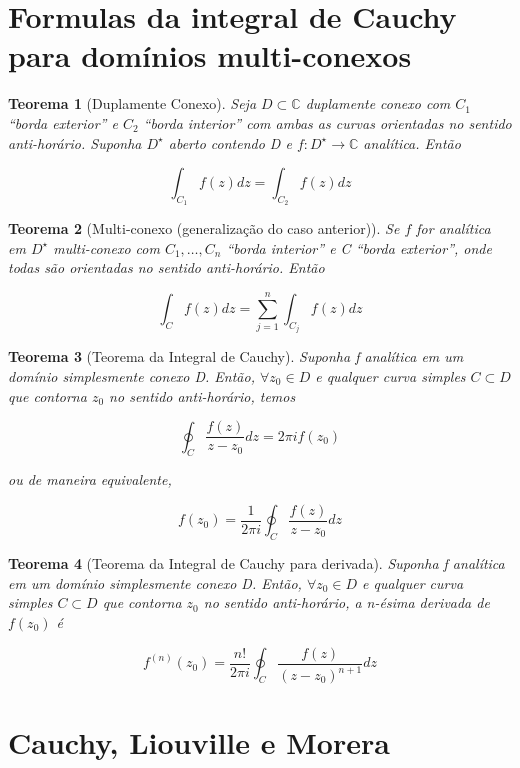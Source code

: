 \documentclass{article}
\newtheorem{theorem}{Teorema}
\begin{document}
\section*{Formulas da integral de Cauchy para domínios multi-conexos}
\label{s6}

\begin{theorem}[Duplamente Conexo]
Seja $D \subset \mathbb{C}$ duplamente conexo com $C_1$ ``borda exterior'' e $C_2$ ``borda interior'' com ambas as curvas orientadas no sentido anti-horário. Suponha $D^\star$ aberto contendo D e $f: D^\star \rightarrow \mathbb{C}$ analítica. Então

$$\int_{C_1} f(z) d z = \int_{C_2} f(z) d z$$
\end{theorem}

\begin{theorem}[Multi-conexo (generalização do caso anterior)]
Se $f$ for analítica em $D^\star$ multi-conexo com $C_1, \ldots, C_n$ ``borda interior'' e C ``borda exterior'', onde todas são orientadas no sentido anti-horário. Então

$$\int_C f(z) d z = \sum_{j = 1}^n \int_{C_j} f(z) d z$$
\end{theorem}

\begin{theorem}[Teorema da Integral de Cauchy]
Suponha f analítica em um domínio simplesmente conexo D. Então, $\forall z_0 \in D$ e qualquer curva simples $C \subset D$ que contorna $z_0$ no sentido anti-horário, temos

$$\oint_C \frac{f(z)}{z - z_0} dz = 2 \pi i f(z_0)$$

ou de maneira equivalente,

$$f(z_0) = \frac{1}{2 \pi i} \oint_C \frac{f(z)}{z - z_0} d z$$
\end{theorem}

\begin{theorem}[Teorema da Integral de Cauchy para derivada]
Suponha f analítica em um domínio simplesmente conexo D. Então, $\forall z_0 \in D$ e qualquer curva simples $C \subset D$ que contorna $z_0$ no sentido anti-horário, a n-ésima derivada de $f(z_0)$ é

$$f^{(n)}(z_0) = \frac{n!}{2 \pi i} \oint_C \frac{f(z)}{(z - z_0)^{n + 1}} d z$$
\end{theorem}

\section*{Cauchy, Liouville e Morera}
\label{s7}
\end{document}

